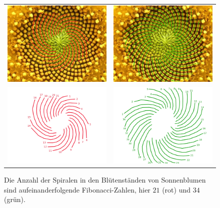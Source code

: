 \begin{figure}
\begin{center}
\begin{tabular}{cc}
\includegraphics[width=0.47\hsize]{graphics/helianthus-fibonacci2.jpg}&%
\includegraphics[width=0.47\hsize]{graphics/helianthus-fibonacci3.jpg}\\%
\includegraphics[width=0.47\hsize]{graphics/helianthus-fibonacci5.jpg}&%
\includegraphics[width=0.47\hsize]{graphics/helianthus-fibonacci4.jpg}
\end{tabular}
\end{center}
\caption{Die Anzahl der Spiralen in den Blütenständen von Sonnenblumen
sind aufeinanderfolgende Fibonacci-Zahlen, hier $21$ (rot) und $34$ (grün).
\label{helianthus}}
\end{figure}

